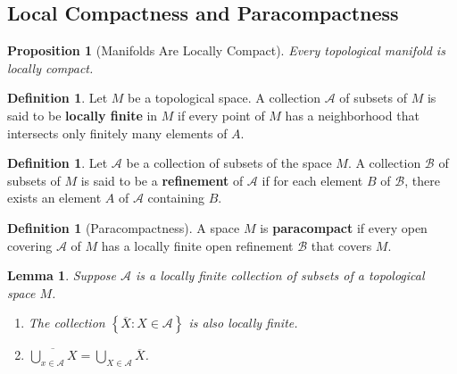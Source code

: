 \documentclass[reqno]{amsart}
\theoremstyle{plain}%
\newtheorem{lemma}[theorem]{Lemma}
\newtheorem{proposition}[theorem]{Proposition}
\theoremstyle{definition}
\newtheorem{definition}[theorem]{Definition}
\theoremstyle{remark}
\begin{document}
    \subsection*{Local Compactness and Paracompactness}
    \begin{proposition}[Manifolds Are Locally Compact]
        Every topological manifold is locally compact.
    \end{proposition}
    \begin{definition}
        Let $M$ be a topological space. A collection
        $\mathcal{A}$ of subsets of $M$ is said to be
        \textbf{locally finite} in $M$ if every point of
        $M$ has a neighborhood that intersects only finitely many elements of $A$.
    \end{definition}
    \begin{definition}
        Let $\mathcal{A}$ be a collection of subsets of the
        space $M$. A collection
        $\mathcal{B}$ of subsets of $M$ is said to be a
        \textbf{refinement} of $\mathcal{A}$ if for each element
        $B$ of $\mathcal{B}$, there exists an element
        $A$ of $\mathcal{A}$ containing $B$.
    \end{definition}
    \begin{definition}[Paracompactness]
        A space $M$ is \textbf{paracompact} if every
        open covering $\mathcal{A}$ of $M$ has a locally finite open refinement
        $\mathcal{B}$ that covers $M$.
    \end{definition}
    \begin{lemma}
        Suppose $\mathcal{A}$ is a locally finite collection of subsets of
        a topological space $M$.
        \begin{enumerate}
            \item The collection $\left\{ \overline{X}  \colon X \in \mathcal{A} \right\} $ 
                is also locally finite.
            \item $\overline{\bigcup_{x \in  \mathcal{A}}X }
                = \bigcup_{X \in \mathcal{A}} \overline{X}$.
        \end{enumerate}
    \end{lemma}
\end{document}
